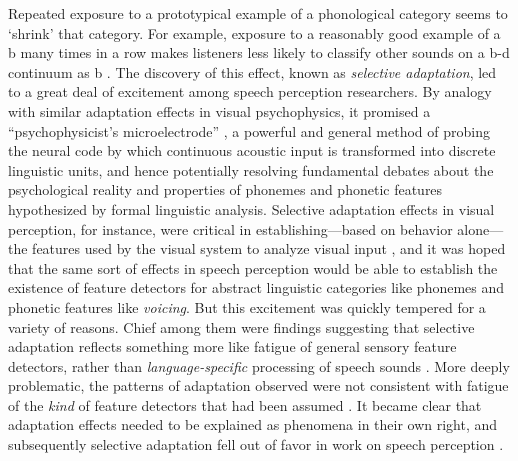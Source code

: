 Repeated exposure to a prototypical example of a phonological category seems to `shrink' that category. For example,  exposure to a reasonably good example of a \ph b many times in a row makes listeners less likely to classify other sounds on a \ph b-\ph d continuum as \ph b \autocite{Eimas1973}.  The discovery of this effect, known as \emph{selective adaptation}, led to a great deal of excitement among speech perception researchers.
By analogy with similar adaptation effects in visual psychophysics, it promised a ``psychophysicist's microelectrode'' \autocite{Frisby1979,Mollon1974}, a powerful and general method of probing the neural code by which continuous acoustic input is transformed into discrete linguistic units, and hence potentially resolving fundamental debates about the psychological reality and properties of phonemes and phonetic features hypothesized by formal linguistic analysis.  Selective adaptation effects in visual perception, for instance, were critical in establishing---based on behavior alone---the features used by the visual system to analyze visual input \autocite[e.g.,][]{Blakemore1969}, and it was hoped that the same sort of effects in speech perception would be able to establish the existence of feature detectors for abstract linguistic categories like phonemes and phonetic features like \emph{voicing}.
But this excitement was quickly tempered for a variety of reasons.  Chief among them were findings suggesting that selective adaptation reflects something more like fatigue of general sensory feature detectors, rather than \emph{language-specific} processing of speech sounds \autocite[e.g.,][]{Remez1979,Samuel1979,Schouten1980,Roberts1981}.  \label{r-fd1} More deeply problematic, the patterns of adaptation observed were not consistent with fatigue of the \emph{kind} of feature detectors that had been assumed \autocite[see][for an excellent critique]{Remez1987}.  It became clear that adaptation effects needed to be explained as phenomena in their own right, and subsequently selective adaptation fell out of favor in work on speech perception \autocite[cf.][]{Remez1987,Samuel1986}.

